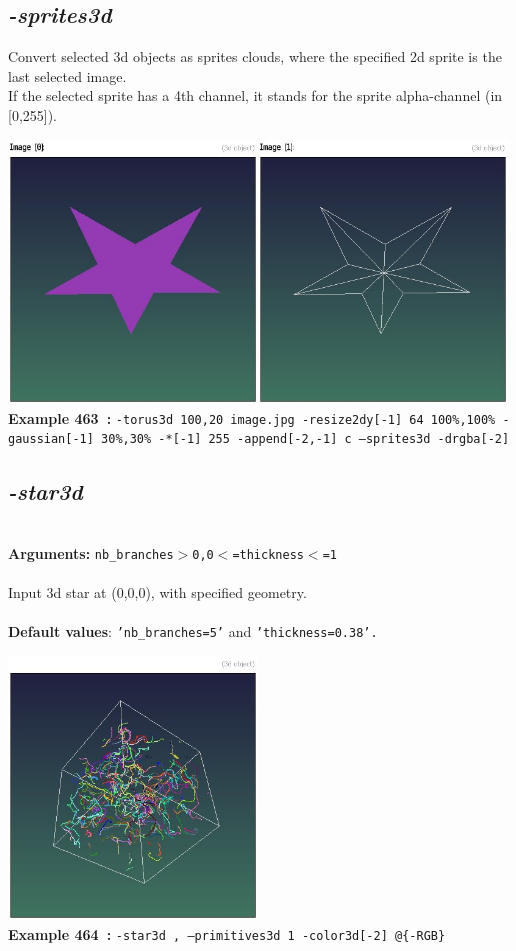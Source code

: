 \documentclass[a4paper,11pt,twoside]{book}
\begin{document}
\subsection{\emph{-sprites3d} }\vspace*{-0.5em}
Convert selected 3d objects as sprites clouds, where the specified 2d sprite is the last selected image.
~\\If the selected sprite has a 4th channel, it stands for the sprite alpha-channel (in [0,255]).
\begin{center}\includegraphics[keepaspectratio=true,height=7cm,width=\textwidth]{img/gmic_def463.jpg}\\
{\footnotesize \textbf{Example 463~:} \texttt{-torus3d 100,20 image.jpg -resize2dy[-1] 64 100\%,100\% -gaussian[-1] 30\%,30\% -*[-1] 255 -append[-2,-1] c --sprites3d -drgba[-2]}}
\end{center}

\subsection{\emph{-star3d} }\vspace*{-0.5em}
~\\\textbf{Arguments: } 
{\small \texttt{nb\_branches$>$0,0$<$=thickness$<$=1}}\\~\\
Input 3d star at (0,0,0), with specified geometry.
~\\~\\\textbf{Default values}: {\small \texttt{'nb\_branches=5'} and \texttt{'thickness=0.38'.}}
\begin{center}\includegraphics[keepaspectratio=true,height=7cm,width=\textwidth]{img/gmic_def464.jpg}\\
{\footnotesize \textbf{Example 464~:} \texttt{-star3d , --primitives3d 1 -color3d[-2] @\{-RGB\}}}
\end{center}
\end{document}
